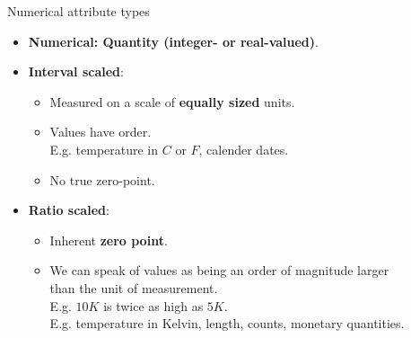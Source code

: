 \documentclass[aspectratio=169,t]{beamer}
\begin{document}
  { 
    \begin{frame}{Numerical attribute types}
    \begin{itemize}
        \item \textbf{Numerical: Quantity (integer- or real-valued)}.
        \item \textbf{Interval scaled}:
            \begin{itemize}
                \item Measured on a scale of \textbf{equally sized} units.
                \item Values have order.\\
                      E.g. temperature in $C$ or $F$, calender dates.
                \item No true zero-point.
            \end{itemize}
        \item \textbf{Ratio scaled}:
        \begin{itemize}
            \item Inherent \textbf{zero point}.
            \item We can speak of values as being an order of magnitude larger \\
            than the unit of measurement.\\
            E.g. $10 K$ is twice as high as $5 K$.\\
            E.g. temperature in Kelvin, length, counts, monetary quantities.
        \end{itemize}
        \end{itemize}
    \end{frame}
  }
\end{document}

